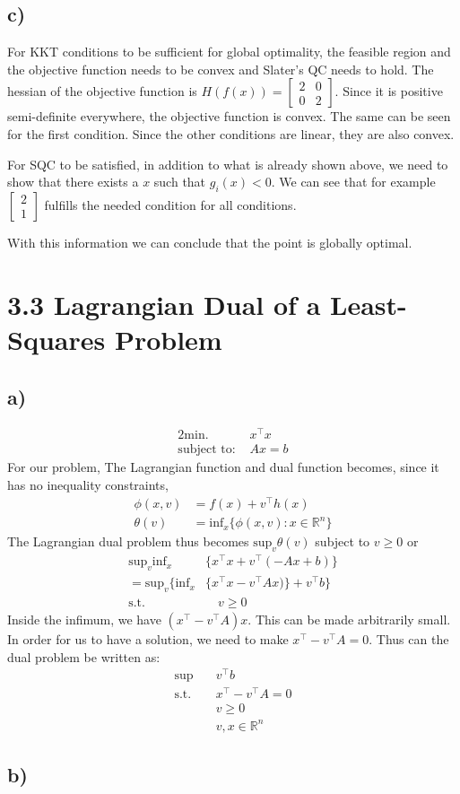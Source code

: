 \documentclass{article}
\begin{document}
\subsection*{c)}
	For KKT conditions to be sufficient for global optimality, the feasible region and the objective function needs to be convex and Slater's QC needs to hold.
	The hessian of the objective function is $H(f(x)) = \begin{bmatrix} 2 & 0 \\ 0 & 2 \end{bmatrix}$. Since it is positive semi-definite everywhere, the objective function is convex. The same can be seen for the first condition. Since the other conditions are linear, they are also convex. 
	
	For SQC to be satisfied, in addition to what is already shown above, we need to show that there exists a $x$ such that $g_i(x)<0$. We can see that for example $\begin{bmatrix}2 \\ 1\end{bmatrix}$ fulfills the needed condition for all conditions. 
	
	With this information we can conclude that the point is globally optimal.
\section*{3.3 Lagrangian Dual of a Least-Squares Problem}
\subsection*{a)}
	\begin{alignat}{2}
		\text{min. } & x^\top x \\
		\text{subject to: } & Ax=b	
	\end{alignat}
	For our problem, The Lagrangian function and dual function becomes, since it has no inequality constraints,
	\begin{align}
		\phi(x,v) &= f(x) + v^\top h(x)\\
		\theta(v) &= \text{inf}_x \{\phi(x,v): x\in \mathbb{R}^n\}
	\end{align}
	The Lagrangian dual problem thus becomes $\text{sup}_v\theta(v)$ subject to $v \geq 0$ or
	\begin{align}
		\text{sup}_v \text{inf}_x & \{x^\top x + v^\top(-Ax+b)\} \\
		= \text{sup}_v \{\text{inf}_x&  \{x^\top x - v^\top Ax)\} +v^\top b\} \\
		\text{s.t.} &\quad v \geq 0
	\end{align}
	Inside the infimum, we have $(x^\top - v^\top A)x$. This can be made arbitrarily small. In order for us to have a solution, we need to make $x^\top - v^\top A = 0$. Thus can the dual problem be written as:
	\begin{align}
		\text{sup} \quad & v^\top b \\
		\text{s.t.} \quad & x^\top - v^\top A = 0\\
		& v\geq 0\\
		& v,x \in \mathbb{R}^n
	\end{align}
\subsection*{b)}
\end{document}
